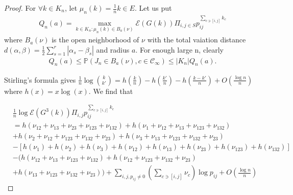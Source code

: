 \documentclass[11pt,en,cite=authoryear]{elegantpaper}
\begin{document}
\begin{proof}
    For $\forall k \in K_n$, let $\mu_n(k) = \frac{1}{n} k \in E$. Let us put
    \begin{align*}
        Q_n(a) = \max_{k\in K_n: \mu_n(k) \in B_a(\nu)} 
        \mathcal{E} (G(k)) \Pi_{i,j \in S} p_{ij}^{\sum_{c \ni [i,j]} k_{c}}
    \end{align*}
    where $B_a(\nu)$ is the open neighborhood of $\nu$ with the total vaiation distance
    $ d(\alpha, \beta) = \frac{1}{2} \sum_{s=1}^r |\alpha_s - \beta_s| $ and radius $a$. 
    For enough large n, clearly
    \begin{align*}
        Q_n(a) 
        \le \mathbb{P}(J_{n} \in B_a(\nu), c \in \mathcal{C}_{\infty})
        \le |K_n| Q_n(a).
    \end{align*}

    Stirling's formula gives
    $\frac{1}{n} \log \binom{k}{k'} = h(\frac{k}{n} ) - h(\frac{k'}{n}) - h(\frac{k-k'}{n}) + O(\frac{\log n}{n})$
    where $h(x)=x\log(x)$. We find that

    \begin{align*}
        &\frac{1}{n} \log \mathcal{E} (G^3(k)) \Pi_{i, j} p_{ij}^{\sum_{c \ni [i,j]} k_{c}} \\
        &= h(\nu_{12} + \nu_{13} + \nu_{23}+\nu_{123}+\nu_{132}) 
        + h(\nu_1 + \nu_{12} + \nu_{13} + \nu_{123} +\nu_{132}) \\
        &+ h(\nu_2 + \nu_{12} + \nu_{123} + \nu_{132} +\nu_{23})
        + h(\nu_3 + \nu_{13} +\nu_{123} +\nu_{132} +\nu_{23}) \\
        &- \left[h(\nu_1) + h(\nu_2) + h(\nu_3) + h(\nu_{12}) + h(\nu_{13}) + h(\nu_{23}) + h(\nu_{123}) + h(\nu_{132})\right] \\
        &- \biggl(h(\nu_{12} + \nu_{13} + \nu_{123} +\nu_{132}) + h(\nu_{12} + \nu_{123} + \nu_{132} +\nu_{23}) \\
        & + h(\nu_{13} +\nu_{123} +\nu_{132} +\nu_{23})\biggr)
        +\sum_{i, j, p_{ij}\neq 0} (\sum_{c \ni[i, j]} \nu_{c}) \log p_{ij} + O(\frac{\log n}{n})
    \end{align*}


\end{proof}
\end{document}
